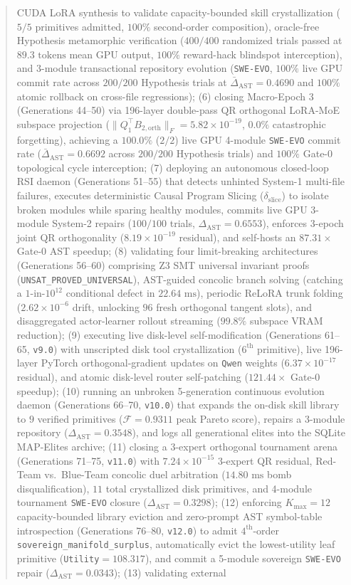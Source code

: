 \documentclass[10pt,twocolumn,letterpaper]{article}
\begin{document}
\begin{abstract}
CUDA LoRA synthesis to validate capacity-bounded skill crystallization ($5/5$ primitives admitted, $100\%$ second-order composition), oracle-free Hypothesis metamorphic verification ($400/400$ randomized trials passed at $89.3\text{ tokens}$ mean GPU output, $100\%$ reward-hack blindspot interception), and 3-module transactional repository evolution (\texttt{SWE-EVO}, $100\%$ live GPU commit rate across $200/200$ Hypothesis trials at $\bar{\Delta}_{\text{AST}}=0.4690$ and $100\%$ atomic rollback on cross-file regressions); (6) closing Macro-Epoch 3 (Generations 44--50) via 196-layer double-pass QR orthogonal LoRA-MoE subspace projection ($\|Q_{1}^{\top}B_{2,\text{orth}}\|_{F}=5.82\times 10^{-19}$, $0.0\%$ catastrophic forgetting), achieving a $100.0\%$ ($2/2$) live GPU 4-module \texttt{SWE-EVO} commit rate ($\bar{\Delta}_{\text{AST}}=0.6692$ across $200/200$ Hypothesis trials) and $100\%$ Gate-0 topological cycle interception; (7) deploying an autonomous closed-loop RSI daemon (Generations 51--55) that detects unhinted System-1 multi-file failures, executes deterministic Causal Program Slicing ($\delta_{\text{slice}}$) to isolate broken modules while sparing healthy modules, commits live GPU 3-module System-2 repairs ($100/100$ trials, $\Delta_{\text{AST}}=0.6553$), enforces 3-epoch joint QR orthogonality ($8.19\times 10^{-19}$ residual), and self-hosts an $87.31\times$ Gate-0 AST speedup; (8) validating four limit-breaking architectures (Generations 56--60) comprising Z3 SMT universal invariant proofs (\texttt{UNSAT\_PROVED\_UNIVERSAL}), AST-guided concolic branch solving (catching a $1\text{-in-}10^{12}$ conditional defect in $22.64\text{ ms}$), periodic ReLoRA trunk folding ($2.62\times 10^{-6}$ drift, unlocking $96$ fresh orthogonal tangent slots), and disaggregated actor-learner rollout streaming ($99.8\%$ subspace VRAM reduction); (9) executing live disk-level self-modification (Generations 61--65, \texttt{v9.0}) with unscripted disk tool crystallization ($6^{\text{th}}$ primitive), live 196-layer PyTorch orthogonal-gradient updates on \texttt{Qwen} weights ($6.37\times 10^{-17}$ residual), and atomic disk-level router self-patching ($121.44\times$ Gate-0 speedup); (10) running an unbroken 5-generation continuous evolution daemon (Generations 66--70, \texttt{v10.0}) that expands the on-disk skill library to $9$ verified primitives ($\mathcal{F}=0.9311$ peak Pareto score), repairs a 3-module repository ($\Delta_{\text{AST}}=0.3548$), and logs all generational elites into the SQLite MAP-Elites archive; (11) closing a 3-expert orthogonal tournament arena (Generations 71--75, \texttt{v11.0}) with $7.24\times 10^{-15}$ 3-expert QR residual, Red-Team vs.\ Blue-Team concolic duel arbitration ($14.80\text{ ms}$ bomb disqualification), $11$ total crystallized disk primitives, and 4-module tournament \texttt{SWE-EVO} closure ($\Delta_{\text{AST}}=0.3298$); (12) enforcing $K_{\max}=12$ capacity-bounded library eviction and zero-prompt AST symbol-table introspection (Generations 76--80, \texttt{v12.0}) to admit $4^{\text{th}}$-order \texttt{sovereign\_manifold\_surplus}, automatically evict the lowest-utility leaf primitive (\texttt{Utility}$=108.317$), and commit a 5-module sovereign \texttt{SWE-EVO} repair ($\Delta_{\text{AST}}=0.0343$); (13) validating external 
\end{abstract}
\end{document}
